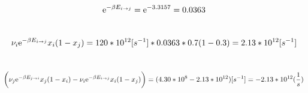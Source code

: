 \documentclass{article}
\begin{document}
\\
\begin{equation}
     {\rm e}^{-\beta {E}_{i\rightarrow j}} = {\rm e}^{-3.3157}=0.0363
\end{equation}
\\
\begin{equation}
    \nu_i{\rm e}^{-\beta {E}_{i\rightarrow j}} x_i(1-x_j) = 120*10^{12}[s^{-1}]*0.0363 * 0.7(1-0.3)=2.13*10^{12}[s^{-1}]
\end{equation}
\\
\begin{equation}
    \bigg( \nu_j{\rm e}^{-\beta {E}_{j\rightarrow i}} x_j(1-x_i)  - \nu_i{\rm e}^{-\beta {E}_{i\rightarrow j}} x_i(1-x_j) \bigg)=(4.30*10^{8}-2.13*10^{12})[s^{-1}]=-2.13*10^{12}(\frac{1}{s})
\end{equation}
\end{document}
